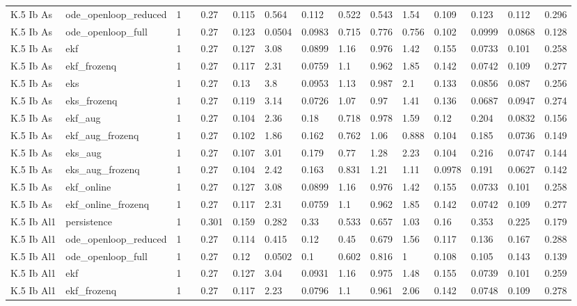 \begin{table}[t]
\begin{tabular}{lllllllllllllll}
K.5 Ib As & ode\_openloop\_reduced & 1 &  & 0.27 & 0.115 & 0.564 & 0.112 & 0.522 & 0.543 & 1.54 & 0.109 & 0.123 & 0.112 & 0.296 \\
K.5 Ib As & ode\_openloop\_full & 1 &  & 0.27 & 0.123 & 0.0504 & 0.0983 & 0.715 & 0.776 & 0.756 & 0.102 & 0.0999 & 0.0868 & 0.128 \\
K.5 Ib As & ekf & 1 &  & 0.27 & 0.127 & 3.08 & 0.0899 & 1.16 & 0.976 & 1.42 & 0.155 & 0.0733 & 0.101 & 0.258 \\
K.5 Ib As & ekf\_frozenq & 1 &  & 0.27 & 0.117 & 2.31 & 0.0759 & 1.1 & 0.962 & 1.85 & 0.142 & 0.0742 & 0.109 & 0.277 \\
K.5 Ib As & eks & 1 &  & 0.27 & 0.13 & 3.8 & 0.0953 & 1.13 & 0.987 & 2.1 & 0.133 & 0.0856 & 0.087 & 0.256 \\
K.5 Ib As & eks\_frozenq & 1 &  & 0.27 & 0.119 & 3.14 & 0.0726 & 1.07 & 0.97 & 1.41 & 0.136 & 0.0687 & 0.0947 & 0.274 \\
K.5 Ib As & ekf\_aug & 1 &  & 0.27 & 0.104 & 2.36 & 0.18 & 0.718 & 0.978 & 1.59 & 0.12 & 0.204 & 0.0832 & 0.156 \\
K.5 Ib As & ekf\_aug\_frozenq & 1 &  & 0.27 & 0.102 & 1.86 & 0.162 & 0.762 & 1.06 & 0.888 & 0.104 & 0.185 & 0.0736 & 0.149 \\
K.5 Ib As & eks\_aug & 1 &  & 0.27 & 0.107 & 3.01 & 0.179 & 0.77 & 1.28 & 2.23 & 0.104 & 0.216 & 0.0747 & 0.144 \\
K.5 Ib As & eks\_aug\_frozenq & 1 &  & 0.27 & 0.104 & 2.42 & 0.163 & 0.831 & 1.21 & 1.11 & 0.0978 & 0.191 & 0.0627 & 0.142 \\
K.5 Ib As & ekf\_online & 1 &  & 0.27 & 0.127 & 3.08 & 0.0899 & 1.16 & 0.976 & 1.42 & 0.155 & 0.0733 & 0.101 & 0.258 \\
K.5 Ib As & ekf\_online\_frozenq & 1 &  & 0.27 & 0.117 & 2.31 & 0.0759 & 1.1 & 0.962 & 1.85 & 0.142 & 0.0742 & 0.109 & 0.277 \\
K.5 Ib Al1 & persistence & 1 &  & 0.301 & 0.159 & 0.282 & 0.33 & 0.533 & 0.657 & 1.03 & 0.16 & 0.353 & 0.225 & 0.179 \\
K.5 Ib Al1 & ode\_openloop\_reduced & 1 &  & 0.27 & 0.114 & 0.415 & 0.12 & 0.45 & 0.679 & 1.56 & 0.117 & 0.136 & 0.167 & 0.288 \\
K.5 Ib Al1 & ode\_openloop\_full & 1 &  & 0.27 & 0.12 & 0.0502 & 0.1 & 0.602 & 0.816 & 1 & 0.108 & 0.105 & 0.143 & 0.139 \\
K.5 Ib Al1 & ekf & 1 &  & 0.27 & 0.127 & 3.04 & 0.0931 & 1.16 & 0.975 & 1.48 & 0.155 & 0.0739 & 0.101 & 0.259 \\
K.5 Ib Al1 & ekf\_frozenq & 1 &  & 0.27 & 0.117 & 2.23 & 0.0796 & 1.1 & 0.961 & 2.06 & 0.142 & 0.0748 & 0.109 & 0.278 \\

\end{tabular}
\end{table}
